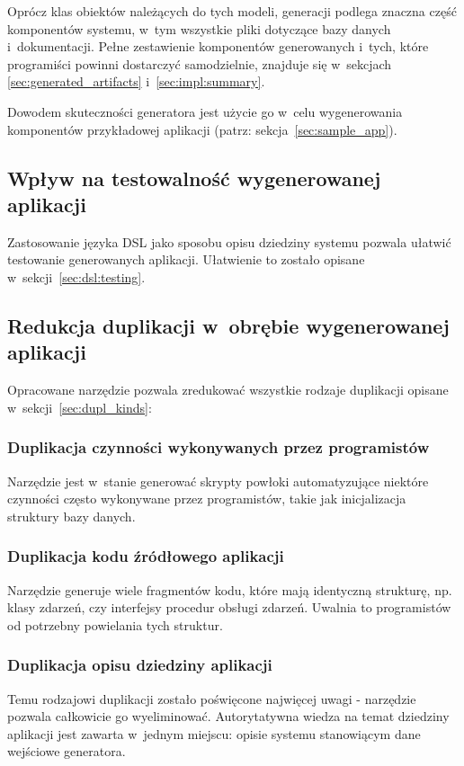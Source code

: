Oprócz klas obiektów należących do tych modeli, generacji podlega znaczna część komponentów systemu, w~tym wszystkie pliki dotyczące bazy danych i~dokumentacji.
Pełne zestawienie komponentów generowanych i~tych, które programiści powinni dostarczyć samodzielnie, znajduje się w~sekcjach \ref{sec:generated_artifacts} i~\ref{sec:impl:summary}.

Dowodem skuteczności generatora jest użycie go w~celu wygenerowania komponentów przykładowej aplikacji (patrz: sekcja~\ref{sec:sample_app}).


\subsection{Wpływ na testowalność wygenerowanej aplikacji}

Zastosowanie języka DSL jako sposobu opisu dziedziny systemu pozwala ułatwić testowanie generowanych aplikacji.
Ułatwienie to zostało opisane w~sekcji~\ref{sec:dsl:testing}.


\subsection{Redukcja duplikacji w~obrębie wygenerowanej aplikacji}

Opracowane narzędzie pozwala zredukować wszystkie rodzaje duplikacji opisane w~sekcji~\ref{sec:dupl_kinds}:

\subsubsection{Duplikacja czynności wykonywanych przez programistów}
Narzędzie jest w~stanie generować skrypty powłoki automatyzujące niektóre czynności często wykonywane przez programistów, takie jak inicjalizacja struktury bazy danych.

\subsubsection{Duplikacja kodu źródłowego aplikacji}
Narzędzie generuje wiele fragmentów kodu, które mają identyczną strukturę, np. klasy zdarzeń, czy interfejsy procedur obsługi zdarzeń.
Uwalnia to programistów od potrzebny powielania tych struktur.

\subsubsection{Duplikacja opisu dziedziny aplikacji}
Temu rodzajowi duplikacji zostało poświęcone najwięcej uwagi - narzędzie pozwala całkowicie go wyeliminować.
Autorytatywna wiedza na temat dziedziny aplikacji jest zawarta w~jednym miejscu: opisie systemu stanowiącym dane wejściowe generatora.


